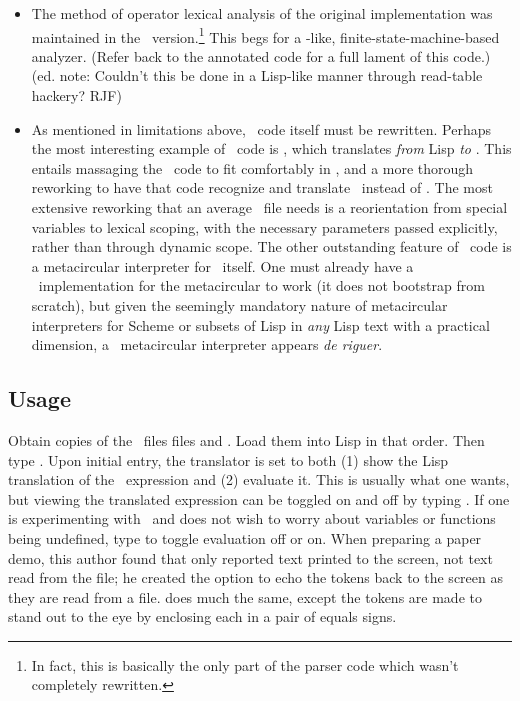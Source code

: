 \begin{itemize}
\item The method of operator lexical analysis of the original implementation was
maintained in the \cl\ version.\footnote{In fact, this is basically the only
part of the parser code which wasn't completely rewritten.}  This begs for
a -like, finite-state-machine-based analyzer.  (Refer back to the
annotated code for a full lament of this code.)
(ed. note: Couldn't this be done in a Lisp-like manner through
read-table hackery? RJF)

\item As mentioned in limitations above, \cgol\ code itself must be
rewritten.  Perhaps the most interesting example of \cgol\ code is
, which translates {\it from} Lisp  {\it to} \cgol.  This
entails massaging the \cgol\ code to fit comfortably in \cl, and a more
thorough reworking to have that code recognize and translate \cl\ instead
of \ml.  The most extensive reworking that an average \cgol\ file needs is
a reorientation from special variables to lexical scoping, with the
necessary parameters passed explicitly, rather than through dynamic
scope.  The other outstanding feature of \cgol\ code is a metacircular
interpreter for \cgol\ itself.  One must already have a \cgol\
implementation for the metacircular to work (it does not bootstrap from
scratch), but given the seemingly mandatory nature of metacircular interpreters
for Scheme or subsets of Lisp in {\it any} Lisp text with a practical
dimension, a \cgol\ metacircular interpreter appears {\it de riguer}.
\end{itemize}


\subsection{Usage}

Obtain copies of the \cl\ files
files  and . Load
them into Lisp in that order.
Then type .  Upon initial entry, the translator is set to both
(1) show the Lisp translation of the \cgol\ expression and (2) evaluate it.
This is usually what one wants, but viewing
the translated expression can be toggled on and
off by typing .  If one is experimenting with \cgol\ and does
not wish to worry about variables or functions being undefined, type
\code{eval \$} to toggle evaluation  off or on.  When preparing a
paper demo, this author found that \code{script} only reported text printed
to the screen, not text read from the file; he created the option
\code{scripting \$} to echo the tokens back to the screen as they are read
from a file.  \code{parser\_debug \$} does much the same, except the tokens
are made to stand out to the eye by enclosing each in a pair of equals
signs.

